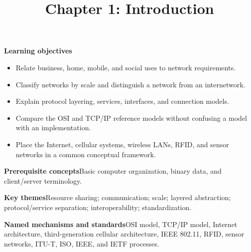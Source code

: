 \documentclass[10pt,letterpaper]{article}
\title{Chapter 1: Introduction}
\author{}
\date{}
\begin{document}
\maketitle
{}
\begin{overviewbox}
\textbf{Learning objectives}\begin{itemize}
  \item Relate business, home, mobile, and social uses to network requirements.
  \item Classify networks by scale and distinguish a network from an internetwork.
  \item Explain protocol layering, services, interfaces, and connection models.
  \item Compare the OSI and TCP/IP reference models without confusing a model with an implementation.
  \item Place the Internet, cellular systems, wireless LANs, RFID, and sensor networks in a common conceptual framework.
\end{itemize}
\textbf{Prerequisite concepts}\quad Basic computer organization, binary data, and client/server terminology.\par
\textbf{Key themes}\quad Resource sharing; communication; scale; layered abstraction; protocol/service separation; interoperability; standardization.\par
\textbf{Named mechanisms and standards}\quad OSI model, TCP/IP model, Internet architecture, third-generation cellular architecture, IEEE 802.11, RFID, sensor networks, ITU-T, ISO, IEEE, and IETF processes.
\end{overviewbox}

\end{document}
